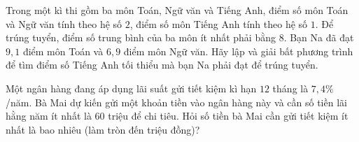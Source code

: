 \begin{vd}
	Trong một kì thi gồm ba môn Toán, Ngữ văn và Tiếng Anh, điểm số môn Toán và Ngữ văn tính theo hệ số $2$, điểm số môn Tiếng Anh tính theo hệ số $1$. Để trúng tuyển, điểm số trung bình của ba môn ít nhất phải bằng $8$. Bạn Na đã đạt $9{,}1$ điểm môn Toán và $6{,}9$ điểm môn Ngữ văn. Hãy lập và giải bất phương trình để tìm điểm số Tiếng Anh tối thiểu mà bạn Na phải đạt để trúng tuyển.
\end{vd}
\begin{vd}
	Một ngân hàng đang áp dụng lãi suất gửi tiết kiệm kì hạn $12$ tháng là $7{,}4\%$/năm. Bà Mai dự kiến gửi một khoản tiền vào ngân hàng này và cần số tiền lãi hằng năm ít nhất là $60$ triệu để chi tiêu. Hỏi số tiền bà Mai cần gửi tiết kiệm ít nhất là bao nhiêu (làm tròn đến triệu đồng)?
\end{vd}
